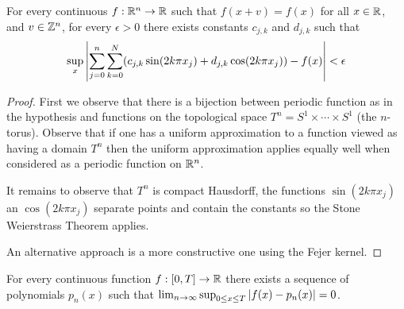\begin{cor}\label{FourierSeries}For
  every continuous $f : \mathbb{R}^n \to \mathbb{R}$ such that $f(x + v) =
  f(x)$ for all $x \in \mathbb{R}$, and $v \in \mathbb{Z}^n$, for every
$\epsilon > 0$  there exists constants $c_{j,k}$ and
$d_{j,k}$ such that 
\begin{align*}
\sup_x \left \vert \sum_{j=0}^n \sum_{k=0}^N (c_{j,k} \sin(2k\pi x_j) + d_{j,k}
\cos(2k\pi x_j)) - f(x) \right \vert < \epsilon
\end{align*}
\end{cor}
\begin{proof}First we observe that there is a bijection between
  periodic function as in the hypothesis and functions on the
  topological space $T^n = S^1 \times \cdots \times S^1$ (the $n$-torus).
Observe that if one has a uniform approximation to a function
viewed as having a domain $T^n$ then the uniform approximation applies
equally well when considered as a periodic function on $\mathbb{R}^n$.

It remains to observe that $T^n$ is compact Hausdorff, the functions $\sin(2k\pi x_j)$ an $\cos(2k
\pi x_j)$ separate points and contain the constants so the Stone Weierstrass
Theorem applies.

An alternative approach is a more constructive one using the Fejer kernel.
\end{proof}

\begin{cor}\label{WeierstrassApproximation}For every continuous
  function $f : [0,T] \to \mathbb{R}$ there exists a sequence of
  polynomials $p_n(x)$ such that $\lim_{n \to \infty} \sup_{0 \leq x \leq T} \left \vert f(x) -
    p_n(x) \right \vert = 0$.
\end{cor}

